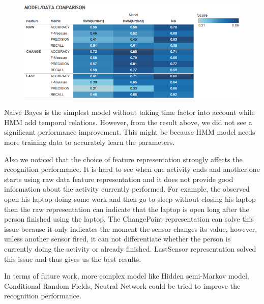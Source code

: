 \documentclass[10pt,letter]{article}
\numberwithin{equation}{section} %
\numberwithin{figure}{section} %
\numberwithin{table}{section} %
\begin{document}
\begin{figure}[h]
\centering
\includegraphics[width=15cm]{model_comparison}
\end{figure}

Naive Bayes is the simplest model without taking time factor into account while HMM add temporal relations. However, from the result above, we did not see a significant performance improvement. This might be because HMM model needs more training data to accurately learn the parameters. 

Also we noticed that the choice of feature representation strongly affects the recognition performance. It is hard to see when one activity ends and another one starts using raw data feature representation and it does not provide good information about the activity currently performed. For example, the observed open his laptop doing some work and then go to sleep without closing his laptop then the raw representation can indicate that the laptop is open long after the person finished using the laptop. The ChangePoint representation can solve this issue because it only indicates the moment the sensor changes its value, however, unless another sensor fired, it can not differentiate whether the person is currently doing the activity or already finished. LastSensor representation solved this issue and thus gives us the best results.  

In terms of future work, more complex model like Hidden semi-Markov model, Conditional Random Fields, Neutral Network could be tried to improve the recognition performance. 
\end{document}
